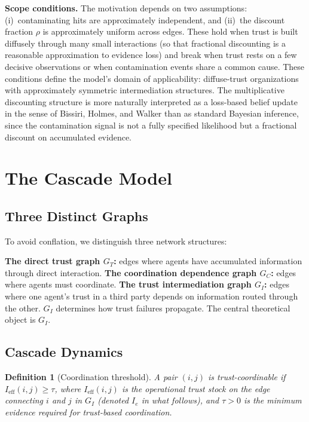 \documentclass[11pt,a4paper]{article}
\newtheorem{definition}{Definition}
\begin{document}
\textbf{Scope conditions.} The motivation depends on two assumptions: (i)~contaminating hits are approximately independent, and (ii)~the discount fraction $\rho$ is approximately uniform across edges. These hold when trust is built diffusely through many small interactions (so that fractional discounting is a reasonable approximation to evidence loss) and break when trust rests on a few decisive observations or when contamination events share a common cause. These conditions define the model's domain of applicability: diffuse-trust organizations with approximately symmetric intermediation structures. The multiplicative discounting structure is more naturally interpreted as a loss-based belief update in the sense of Bissiri, Holmes, and Walker \cite{bissiri2016} than as standard Bayesian inference, since the contamination signal is not a fully specified likelihood but a fractional discount on accumulated evidence.



\section{The Cascade Model}

\subsection{Three Distinct Graphs}

To avoid conflation, we distinguish three network structures:

\textbf{The direct trust graph $G_T$:} edges where agents have accumulated information through direct interaction. \textbf{The coordination dependence graph $G_C$:} edges where agents must coordinate. \textbf{The trust intermediation graph $G_I$:} edges where one agent's trust in a third party depends on information routed through the other. $G_I$ determines how trust failures propagate. The central theoretical object is $G_I$.

\subsection{Cascade Dynamics}

\begin{definition}[Coordination threshold]
A pair $(i,j)$ is \emph{trust-coordinable} if $I_{\mathrm{eff}}(i,j) \geq \tau$, where $I_{\mathrm{eff}}(i,j)$ is the operational trust stock on the edge connecting $i$ and $j$ in $G_I$ (denoted $I_e$ in what follows), and $\tau > 0$ is the minimum evidence required for trust-based coordination.
\end{definition}
\end{document}
